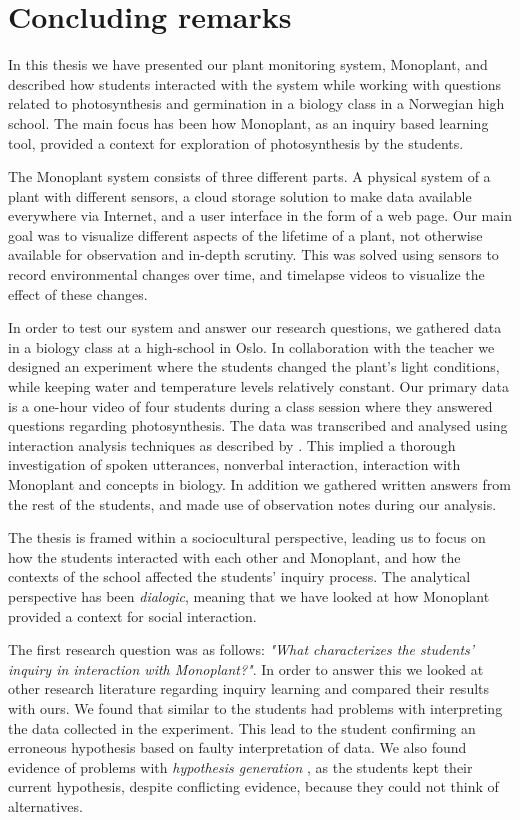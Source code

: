 \chapter{Concluding remarks}
In this thesis we have presented our plant monitoring system, Monoplant, and described how students interacted with the system while working with questions related to photosynthesis and germination in a biology class in a Norwegian high school. The main focus has been how Monoplant, as an inquiry based learning tool, provided a context for exploration of photosynthesis by the students. 

The Monoplant system consists of three different parts. A physical system of a plant with different sensors, a cloud storage solution to make data available everywhere via Internet, and a user interface in the form of a web page. Our main goal was to visualize different aspects of the lifetime of a plant, not otherwise available for observation and in-depth scrutiny. This was solved using sensors to record environmental changes over time, and timelapse videos to visualize the effect of these changes. 

In order to test our system and answer our research questions, we gathered data in a biology class at a high-school in Oslo. In collaboration with the teacher we designed an experiment where the students changed the plant's light conditions, while keeping water and temperature levels relatively constant. Our primary data is a one-hour video of four students during a class session where they answered questions regarding photosynthesis. The data was transcribed and analysed using interaction analysis techniques as described by \citet{jordan1995interaction}. This implied a thorough investigation of spoken utterances, nonverbal interaction, interaction with Monoplant and concepts in biology. In addition we gathered written answers from the rest of the students, and made use of observation notes during our analysis. 

The thesis is framed within a sociocultural perspective, leading us to focus on how the students interacted with each other and Monoplant, and how the contexts of the school affected the students' inquiry process. The analytical perspective has been \emph{dialogic}, meaning that we have looked at how Monoplant provided a context for social interaction. 

The first research question was as follows: \emph{"What characterizes the students’ inquiry in interaction with Monoplant?"}. In order to answer this we looked at other research literature regarding inquiry learning and compared their results with ours. We found that similar to \citeauthor*{klahr1993heuristics} \citetext{\citeyear{klahr1993heuristics}, referenced in \citealp{de1998scientific}} the students had problems with interpreting the data collected in the experiment. This lead to the student confirming an erroneous hypothesis based on faulty interpretation of data. We also found evidence of problems with \emph{hypothesis generation} \citep{de1998scientific}, as the students kept their current hypothesis, despite conflicting evidence, because they could not think of alternatives. 

